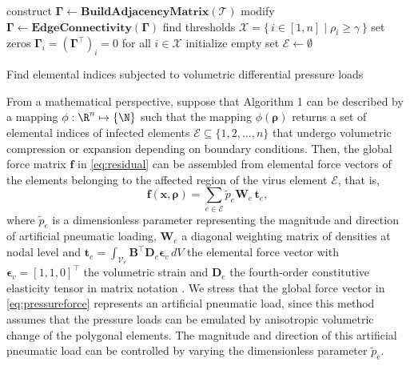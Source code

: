 \begin{algorithm}[!t]
    construct $\boldsymbol{\Gamma}  \gets {\textbf{BuildAdjacencyMatrix}}(\mathcal{T})$\;
    modify $\boldsymbol{\Gamma}  \gets {\textbf{EdgeConnectivity}}(\boldsymbol{\Gamma})$\;
    find thresholds $\mathcal{X} = \{\, i \in [1,n] \;|\; \rho_i \ge \gamma \,\}$\;
    set zeros $\boldsymbol{\Gamma}_i = (\boldsymbol{\Gamma}^\top)_i = 0$ for all $i \in  \mathcal{X}$\;
    initialize empty set $\mathcal{E} \gets \emptyset$\;
    \caption{Find elemental indices subjected to volumetric differential pressure loads \label{alg:floodfill}}
\end{algorithm}

From a mathematical perspective, suppose that Algorithm 1 can be described by a mapping $\phi: \R^n \mapsto \{\N\}$ such that the mapping $\phi(\boldsymbol{\rho})$ returns a set of elemental indices of infected elements $\mathcal{E} \subseteq \{1,2,...,n\}$ that undergo volumetric compression or expansion depending on boundary conditions. Then, the global force matrix $\boldsymbol{f}$ in \eqref{eq:residual} can be assembled from elemental force vectors of the elements belonging to the affected region of the virus element $\mathcal{E}$, that is, 
%
\begin{equation}
\boldsymbol{f}(\boldsymbol{x},\boldsymbol{\rho}) = \sum_{e \in \mathcal{E}} \tilde{p}_e \boldsymbol{W}_{\!e} \, \boldsymbol{t}_{e}, \label{eq:pressureforce}
\end{equation}
%
where $\tilde{p}_e$ is a dimensionless parameter representing the magnitude and direction of artificial pneumatic loading, $\boldsymbol{W}_{\!e}$ a diagonal weighting matrix of densities at nodal level and $\boldsymbol{t}_e = \int_{\mathcal{V}_e} \boldsymbol{B}^\top \boldsymbol{D}_e \boldsymbol{\epsilon}_{v} \, dV$ the elemental force vector with $\boldsymbol{\epsilon}_{v} = [1,1,0]^\top$ the volumetric strain and $\boldsymbol{D}_e$ the fourth-order constitutive elasticity tensor in matrix notation \cite{Renaud2011}. We stress that the global force vector in \eqref{eq:pressureforce} represents an artificial pneumatic load, since this method assumes that the pressure loads can be emulated by anisotropic volumetric change of the polygonal elements. The magnitude and direction of this artificial pneumatic load can be controlled by varying the dimensionless parameter $\tilde{p}_e$.


